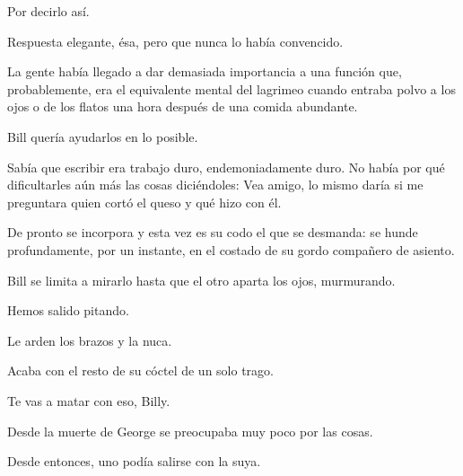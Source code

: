\sk
Por decirlo así.

\sk
Respuesta elegante, ésa, pero que nunca lo había convencido.

\sk
La gente había llegado a dar demasiada importancia a
una función que, probablemente, era el
equivalente mental del lagrimeo cuando entraba
polvo a los ojos o de los flatos una hora después
de una comida abundante.

\sk
Bill quería ayudarlos en lo posible.

\sk
Sabía que escribir era
trabajo duro, endemoniadamente duro. No había
por qué dificultarles aún más las cosas
diciéndoles: Vea amigo, lo mismo daría si me
preguntara quien cortó el queso y qué hizo con él.

\sk
De pronto se incorpora y esta vez es su codo
el que se desmanda: se hunde profundamente, por
un instante, en el costado de su gordo compañero
de asiento.

\sk
Bill se limita a mirarlo hasta que el otro aparta los
ojos, murmurando.

\sk
Hemos salido pitando.

\sk
Le arden los brazos y la nuca.

\sk
Acaba con el resto de su cóctel de un solo trago.

\sk
Te vas a matar con eso, Billy.

\sk
Desde la muerte de George se preocupaba muy poco por las cosas.

\sk
Desde entonces, uno podía salirse con la suya.


